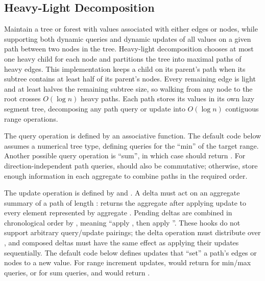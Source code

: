 \subsection{Heavy-Light Decomposition}
\label{sec:2.8.8}
Maintain a tree or forest with values associated with either edges or nodes, while supporting both dynamic queries and dynamic updates of all values on a given path between two nodes in the tree. Heavy-light decomposition chooses at most one heavy child for each node and partitions the tree into maximal paths of heavy edges. This implementation keeps a child on its parent's path when its subtree contains at least half of its parent's nodes. Every remaining edge is light and at least halves the remaining subtree size, so walking from any node to the root crosses $O(\log n)$ heavy paths. Each path stores its values in its own lazy segment tree, decomposing any path query or update into $O(\log n)$ contiguous range operations.

The query operation is defined by an associative  function. The default code below assumes a numerical tree type, defining queries for the ``min'' of the target range. Another possible query operation is ``sum'', in which case  should return . For direction-independent path queries,  should also be commutative; otherwise, store enough information in each aggregate to combine paths in the required order.

The update operation is defined by  and . A delta must act on an aggregate summary of a path of length :  returns the aggregate after applying update  to every element represented by aggregate . Pending deltas are combined in chronological order by , meaning ``apply , then apply ''. These hooks do not support arbitrary query/update pairings; the delta operation must distribute over , and composed deltas must have the same effect as applying their updates sequentially. The default code below defines updates that ``set'' a path's edges or nodes to a new value. For range increment updates,  would return  for min/max queries, or  for sum queries, and  would return .

